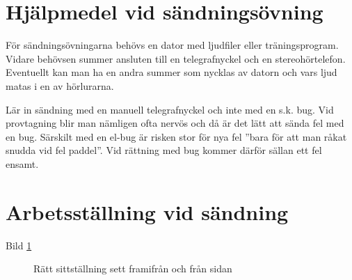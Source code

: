 \section{Hjälpmedel vid sändningsövning}

För sändningsövningarna behövs en dator med ljudfiler eller träningsprogram.
Vidare behövsen summer ansluten till en telegrafnyckel och en stereohörtelefon.
Eventuellt kan man ha en andra summer som nycklas av datorn och vars ljud matas
i en av hörlurarna.

Lär in sändning med en manuell telegrafnyckel och inte med en s.k. bug. Vid
provtagning blir man nämligen ofta nervös och då är det lätt att sända fel med
en bug. Särskilt med en el-bug är risken stor för nya fel ''bara för att man
råkat snudda vid fel paddel''.
Vid rättning med bug kommer därför sällan ett fel ensamt.

\section{Arbetsställning vid sändning}

Bild \ref{fig:bild_morse_3_4}

\begin{figure}
  \caption{Rätt sittställning sett framifrån och från sidan}
  \label{fig:bild_morse_3_4}
\end{figure}

